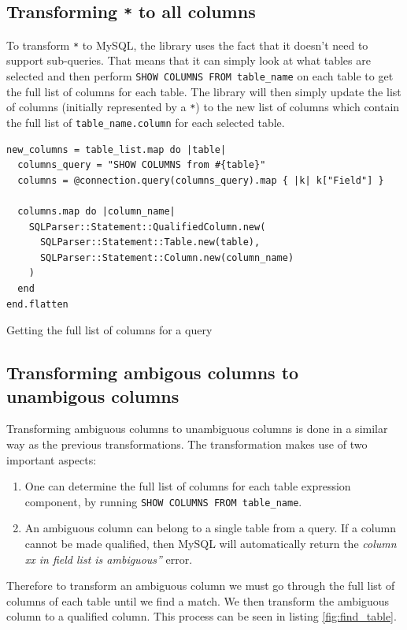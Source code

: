 \subsection{Transforming \texttt{*} to all columns}
To transform \texttt{*} to MySQL, the library uses the fact that it doesn't need to support sub-queries. That means that it can simply look at what tables are selected and then perform \texttt{SHOW COLUMNS FROM table_name} on each table to get the full list of columns for each table. The library will then simply update the list of columns (initially represented by a \texttt{*}) to the new list of columns which contain the full list of \texttt{table\_name.column} for each selected table.

\begin{listing}
\begin{verbatim}
new_columns = table_list.map do |table|
  columns_query = "SHOW COLUMNS from #{table}"
  columns = @connection.query(columns_query).map { |k| k["Field"] }

  columns.map do |column_name|
    SQLParser::Statement::QualifiedColumn.new(
      SQLParser::Statement::Table.new(table),
      SQLParser::Statement::Column.new(column_name)
    )
  end
end.flatten
\end{verbatim}
\caption{Getting the full list of columns for a query}
\end{listing}

\subsection{Transforming ambigous columns to unambigous columns}
Transforming ambiguous columns to unambiguous columns is done in a similar way as the previous transformations. The transformation makes use of two important aspects:
\begin{enumerate}
    \item One can determine the full list of columns for each table expression component, by running \texttt{SHOW COLUMNS FROM table_name}.
    \item An ambiguous column can belong to a single table from a query. If a column cannot be made qualified, then MySQL will automatically return the \textit{column xx in field list is ambiguous''} error.
\end{enumerate}

Therefore to transform an ambiguous column we must go through the full list of columns of each table until we find a match. We then transform the ambiguous column to a qualified column. This process can be seen in listing \ref{fig:find_table}.

